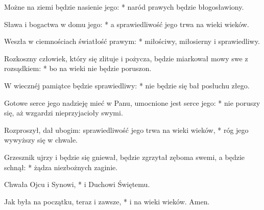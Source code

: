 ﻿\item Możne na ziemi będzie nasienie jego: * naród prawych będzie błogosławiony.
\item Sława i bogactwa w domu jego: * a sprawiedliwość jego trwa na wieki wieków.
\item Weszła w ciemnościach światłość prawym: * miłościwy, miłosierny i sprawiedliwy.
\item Rozkoszny człowiek, który się zlituje i pożycza, będzie miarkował mowy swe z rozsądkiem: * bo na wieki nie będzie poruszon.
\item W wiecznéj pamiątce będzie sprawiedliwy: * nie będzie się bał posłuchu złego.
\item Gotowe serce jego nadzieję mieć w Panu, umocnione jest serce jego: * nie poruszy się, aż wzgardzi nieprzyjacioły swymi.
\item Rozproszył, dał ubogim: sprawiedliwość jego trwa na wieki wieków, * róg jego wywyższy się w chwale.
\item Grzesznik ujrzy i będzie się gniewał, będzie zgrzytał zęboma swemi, a będzie schnął: * żądza niezbożnych zaginie.
\item Chwała Ojcu i Synowi, * i Duchowi Świętemu.
\item Jak była na początku, teraz i zawsze, * i na wieki wieków. Amen.
